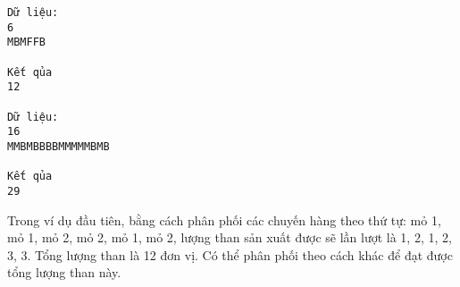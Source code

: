 \begin{verbatim}
Dữ liệu:
6
MBMFFB

Kết qủa
12

Dữ liệu:
16
MMBMBBBBMMMMMBMB

Kết qủa
29
\end{verbatim}

   Trong ví dụ đầu tiên, bằng cách phân phối các chuyến hàng theo thứ tự: mỏ 1, mỏ 1, mỏ 2, mỏ 2, mỏ 1, mỏ 2, lượng than sản xuất được sẽ lần lượt là 1, 2, 1, 2, 3, 3. Tổng lượng than là 12 đơn vị. Có thể phân phối theo cách khác để đạt được tổng lượng than này.